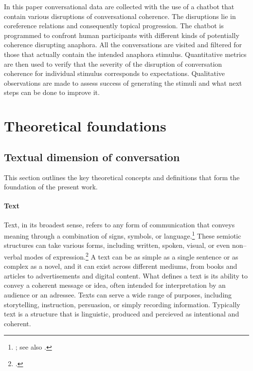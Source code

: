 \documentclass[12pt]{report}
\begin{document}
{In this paper conversational data are collected
with the use of a chatbot
that contain various disruptions of conversational coherence.
The disruptions lie in coreference relations and consequently topical progression.
The chatbot is programmed to confront human participants with
different kinds of potentially coherence disrupting anaphora.
All the conversations are visited and filtered for those
that actually contain the intended anaphora stimulus.
Quantitative metrics are then used to verify that
the severity of the disruption of conversation coherence for individual stimulus corresponds to expectations.
Qualitative observations are made to assess
success of generating the stimuli and what next steps can be done to improve it.




\chapter{Theoretical foundations}


\section{Textual dimension of conversation}
\par
    This section outlines the key theoretical concepts and definitions
    that form the foundation of the present work.


\subsubsection{Text}
\par
    Text, in its broadest sense, refers to any form of communication that conveys meaning through a combination of signs, symbols, or language.\footnote{\cite[p.~7]{hrbacek1994}; see also \cite{hjelmslev2016}.}
    These semiotic structures can take various forms, including written, spoken, visual, or even non–verbal modes of expression.\footcite[p.~13]{barthes1977image}
    A text can be as simple as a single sentence or as complex as a novel, and it can exist across different mediums, from books and articles to advertisements and digital content.
    What defines a text is its ability to convey a coherent message or idea, often intended for interpretation by an audience or an adressee.
    Texts can serve a wide range of purposes, including storytelling, instruction, persuasion, or simply recording information.
    Typically text is a structure that is
    linguistic, produced and percieved as intentional and coherent.

}
\end{document}
